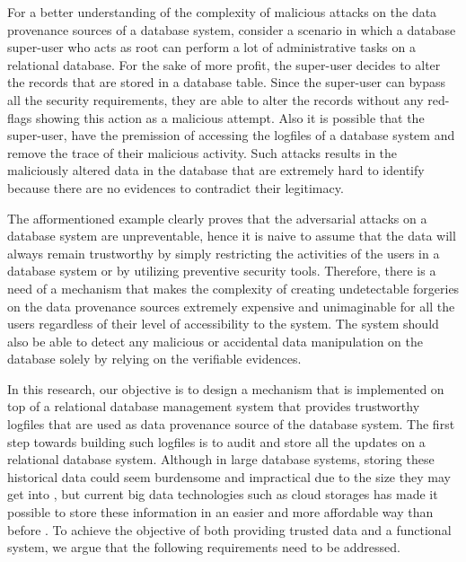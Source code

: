 		For a better understanding of the complexity of malicious attacks on the data provenance sources of a database system, consider a scenario in which a database super-user who acts as root can perform a lot of administrative tasks on a relational database. For the sake of more profit, the super-user decides to alter the records that are stored in a database table. Since the super-user can bypass all the security requirements, they are able to alter the records without any red-flags showing this action as a malicious attempt. Also it is possible that the super-user, have the premission of accessing the logfiles of a database system and remove the trace of their malicious activity. Such attacks results in the maliciously altered data in the database that are extremely hard to identify because there are no evidences to contradict their legitimacy.
		
		The afformentioned example clearly proves that the adversarial attacks on a database system are unpreventable, hence it is naive to assume that the data will always remain trustworthy by simply restricting the activities of the users in a database system or by utilizing preventive security tools. Therefore, there is a need of a mechanism that makes the complexity of creating undetectable forgeries on the data provenance sources extremely expensive and unimaginable for all the users regardless of their level of accessibility to the system. The system should also be able to detect any malicious or accidental data manipulation on the database solely by relying on the verifiable evidences.

		In this research, our objective is to design a mechanism that is implemented on top of a relational database management system that provides trustworthy logfiles that are used as data provenance source of the database system. The first step towards building such logfiles is to audit and store all the updates on a relational database system. Although in large database systems, storing these historical data could seem burdensome and impractical due to the size they may get into \cite{crosby2009tamper-evident}, but current big data technologies such as cloud storages has made it possible to store these information in an easier and more affordable way than before \cite{talia2015dataanalysis}. To achieve the objective of both providing trusted data and a functional system, we argue that the following requirements need to be addressed.

